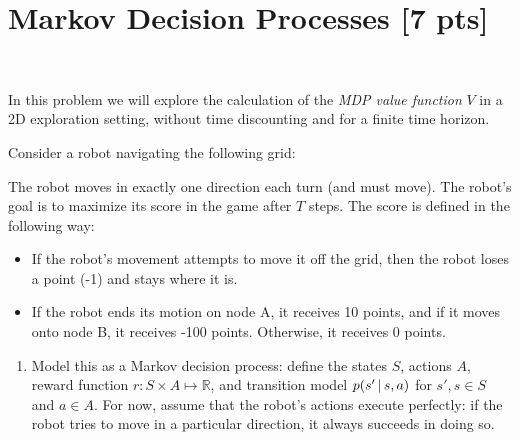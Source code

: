 \documentclass[submit]{harvardml}
\begin{document}
\newpage

\section*{Markov Decision Processes [7 pts]}
\begin{problem}
  ~


  \noindent In this problem we will explore the calculation of the \emph{MDP
  value function} $V$  in a 2D exploration setting, without time discounting
  and for a finite time horizon.

Consider a robot navigating the following grid:\\
  \begin{center}
\end{center}
The robot moves in exactly one direction each turn (and must move). The robot's
goal is to maximize its score in the game after $T$ steps. The score is defined
in the following way:

\begin{itemize}
  \item If the robot's movement attempts to move it off the grid, then the
      robot loses a point (-1) and stays where it is.
  \item If the robot ends its motion on node A, it receives 10 points, and if
      it moves onto node B, it receives -100 points. Otherwise, it receives 0
      points.
\end{itemize}

  \begin{enumerate}
    \item Model this as a Markov decision process: define the states $S$,
        actions $A$, reward function $r:S\times A\mapsto \mathbb{R}$, and
        transition model $p(s'\,|\, s, a)$ for $s', s\in S$ and $a\in A$.  For
        now, assume that the robot's actions execute perfectly: if the robot
        tries to move in a particular direction, it always succeeds in doing
        so.


\end{enumerate}
\end{problem}
\end{document}
